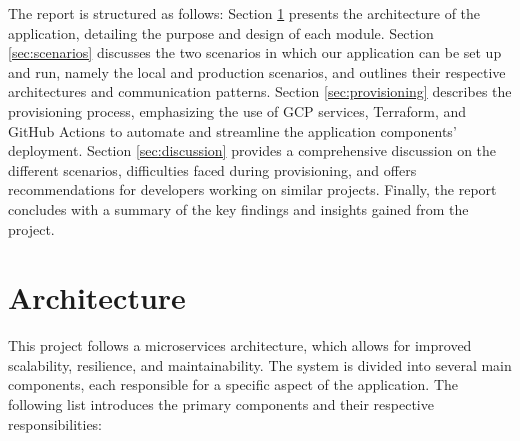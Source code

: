 \documentclass[a4paper,fleqn]{cas-dc}
\begin{document}
The report is structured as follows: Section \ref{sec:architecture} presents the architecture of the application, detailing the purpose and design of each module. Section \ref{sec:scenarios} discusses the two scenarios in which our application can be set up and run, namely the local and production scenarios, and outlines their respective architectures and communication patterns. Section \ref{sec:provisioning} describes the provisioning process, emphasizing the use of GCP services, Terraform, and GitHub Actions to automate and streamline the application components' deployment. Section \ref{sec:discussion} provides a comprehensive discussion on the different scenarios, difficulties faced during provisioning, and offers recommendations for developers working on similar projects. Finally, the report concludes with a summary of the key findings and insights gained from the project.

\section{Architecture}\label{sec:architecture}

This project follows a microservices architecture, which allows for improved scalability, resilience, and maintainability. The system is divided into several main components, each responsible for a specific aspect of the application. The following list introduces the primary components and their respective responsibilities:
\end{document}
